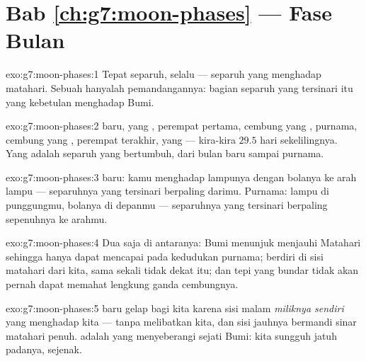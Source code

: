 \section*{Bab \ref{ch:g7:moon-phases} --- Fase Bulan}

\begin{solution}{exo:g7:moon-phases:1}
Tepat separuh, selalu --- separuh yang menghadap matahari. Sebuah 
hanyalah pemandangannya: bagian separuh yang tersinari itu yang
kebetulan menghadap Bumi.
\end{solution}

\begin{solution}{exo:g7:moon-phases:2}
 baru,  yang , perempat pertama, cembung yang
, purnama, cembung yang , perempat terakhir, 
yang  --- kira-kira $29.5$ hari sekelilingnya. Yang 
adalah separuh yang bertumbuh, dari bulan baru sampai purnama.
\end{solution}

\begin{solution}{exo:g7:moon-phases:3}
 baru: kamu menghadap lampunya dengan bolanya ke arah lampu ---
separuhnya yang tersinari berpaling darimu. Purnama: lampu di
punggungmu, bolanya di depanmu --- separuhnya yang tersinari berpaling
sepenuhnya ke arahmu.
\end{solution}

\begin{solution}{exo:g7:moon-phases:4}
Dua saja di antaranya:  Bumi menunjuk menjauhi Matahari
sehingga hanya dapat mencapai  pada kedudukan purnama; 
 berdiri di sisi matahari dari kita, sama sekali tidak dekat
 itu; dan tepi  yang bundar tidak akan
pernah dapat memahat lengkung ganda cembungnya.
\end{solution}

\begin{solution}{exo:g7:moon-phases:5}
 baru gelap bagi kita karena sisi malam \emph{miliknya sendiri}
yang menghadap kita --- tanpa melibatkan  kita, dan sisi
jauhnya bermandi sinar matahari penuh.  adalah  yang menyeberangi  sejati Bumi:  kita sungguh
jatuh padanya, sejenak.
\end{solution}

